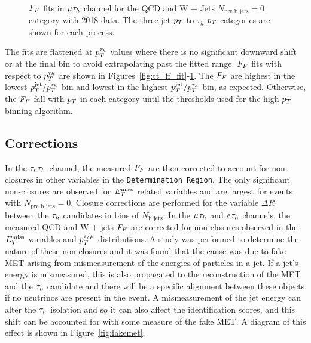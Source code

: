 \begin{figure}[!hbtp]
     \\
\caption[Plots of the fake factor fits in the $\mu\tauh$ channel.]{$F_{F}$ fits in $\mu\tauh$ channel for the QCD and W + Jets $N_{\text{pre b jets}}=0$ category with 2018 data. The three jet $p_{T}$ to $\tau_h$ $p_{T}$ categories are shown for each process.}
\label{fig:mt_ff_fit}
\end{figure}

The fits are flattened at $p_{T}^{\tau_h}$ values where there is no significant downward shift or at the final bin to avoid extrapolating past the fitted range. 
$F_{F}$ fits with respect to $p_{T}^{\tau_h}$ are shown in Figures~\ref{fig:tt_ff_fit}-\ref{fig:mt_ff_fit}. 
The $F_{F}$ are highest in the lowest $p_{T}^{\text{jet}}/p_{T}^{\tau_h}$ bin and lowest in the highest $p_{T}^{\text{jet}}/p_{T}^{\tau_h}$ bin, as expected. 
Otherwise, the $F_{F}$ fall with $p_{T}$ in each category until the thresholds used for the high $p_{T}$ binning algorithm.

\subsection{Corrections}

In the $\tau_{h}\tau_{h}$ channel, the measured $F_{F}$ are then corrected to account for non-closures in other variables in the \texttt{Determination Region}. 
The only significant non-closures are observed for $E_{T}^{\text{miss}}$ related variables and are largest for events with $N_{\text{pre b jets}}=0$. 
Closure corrections are performed for the variable $\Delta R$ between the $\tau_{h}$ candidates in bins of $N_{\text{b jets}}$.
In the $\mu_{}\tau_{h}$ and $e_{}\tau_{h}$ channels, the measured QCD and W + jets $F_{F}$ are corrected for non-closures observed in the $E_{T}^{\text{miss}}$ variables and $p_{T}^{e/\mu}$ distributions.
A study was performed to determine the nature of these non-closures and it was found that the cause was due to fake \ac{MET} arising from mismeasurement of the energies of particles in a jet. 
If a jet's energy is mismeasured, this is also propagated to the reconstruction of the \ac{MET} and the $\tau_{h}$ candidate and there will be a specific alignment between these objects if no neutrinos are present in the event.
A mismeasurement of the jet energy can alter the $\tau_{h}$ isolation and so it can also affect the identification scores, and this shift can be accounted for with some measure of the fake \ac{MET}.
A diagram of this effect is shown in Figure~\ref{fig:fakemet}. \\

